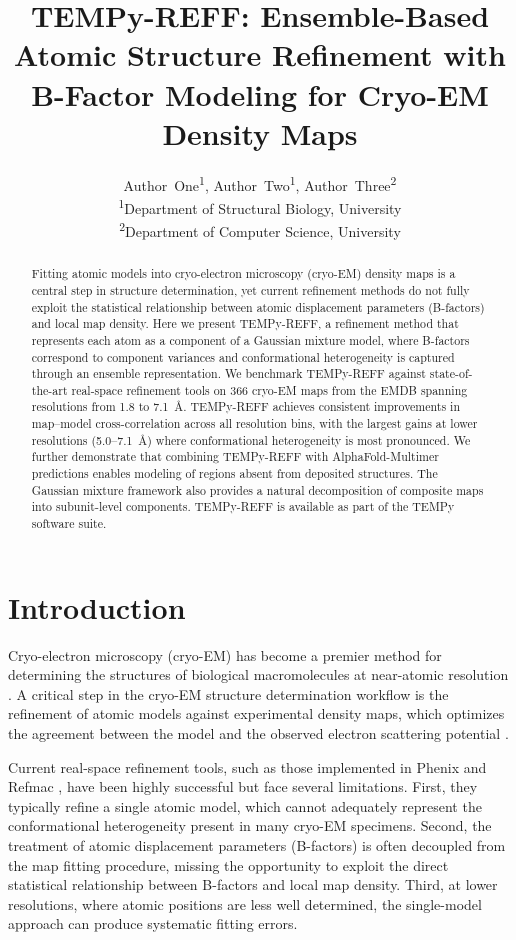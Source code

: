 \documentclass[11pt]{article}
\title{TEMPy-REFF: Ensemble-Based Atomic Structure Refinement with B-Factor Modeling for Cryo-EM Density Maps}
\author{
  Author~One\textsuperscript{1},
  Author~Two\textsuperscript{1},
  Author~Three\textsuperscript{2} \\
  \textsuperscript{1}Department of Structural Biology, University \\
  \textsuperscript{2}Department of Computer Science, University
}
\date{}
\begin{document}
\maketitle

\begin{abstract}
Fitting atomic models into cryo-electron microscopy (cryo-EM) density maps is a central step in structure determination, yet current refinement methods do not fully exploit the statistical relationship between atomic displacement parameters (B-factors) and local map density. Here we present TEMPy-REFF, a refinement method that represents each atom as a component of a Gaussian mixture model, where B-factors correspond to component variances and conformational heterogeneity is captured through an ensemble representation. We benchmark TEMPy-REFF against state-of-the-art real-space refinement tools on 366 cryo-EM maps from the EMDB spanning resolutions from 1.8 to 7.1~\AA. TEMPy-REFF achieves consistent improvements in map--model cross-correlation across all resolution bins, with the largest gains at lower resolutions (5.0--7.1~\AA) where conformational heterogeneity is most pronounced. We further demonstrate that combining TEMPy-REFF with AlphaFold-Multimer predictions enables modeling of regions absent from deposited structures. The Gaussian mixture framework also provides a natural decomposition of composite maps into subunit-level components. TEMPy-REFF is available as part of the TEMPy software suite.
\end{abstract}

\section{Introduction}

Cryo-electron microscopy (cryo-EM) has become a premier method for determining the structures of biological macromolecules at near-atomic resolution \citep{kuhlbrandt2014,cheng2018}. A critical step in the cryo-EM structure determination workflow is the refinement of atomic models against experimental density maps, which optimizes the agreement between the model and the observed electron scattering potential \citep{murshudov2011,afonine2018}.

Current real-space refinement tools, such as those implemented in Phenix \citep{afonine2018} and Refmac \citep{murshudov2011}, have been highly successful but face several limitations. First, they typically refine a single atomic model, which cannot adequately represent the conformational heterogeneity present in many cryo-EM specimens. Second, the treatment of atomic displacement parameters (B-factors) is often decoupled from the map fitting procedure, missing the opportunity to exploit the direct statistical relationship between B-factors and local map density. Third, at lower resolutions, where atomic positions are less well determined, the single-model approach can produce systematic fitting errors.
\end{document}
